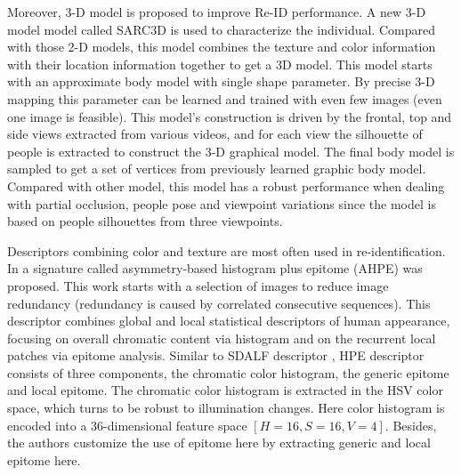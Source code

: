 Moreover, 3-D model is proposed to improve Re-ID performance. A new 3-D model model called SARC3D \cite{SARC3D} is used to characterize the individual. Compared with those 2-D models, this model combines the texture and color information with their location information together to get a 3D model. This model starts with an approximate body model with single shape parameter. By precise 3-D mapping this parameter can be learned and trained with even few images (even one image is feasible). This model's construction is driven by the frontal, top and side views extracted from various videos, and for each view the silhouette of people is extracted to construct the 3-D graphical model. The final body model is sampled to get a set of vertices from previously learned graphic body model. Compared with other model, this model has a robust performance when dealing with partial occlusion, people pose and viewpoint variations since the model is based on people silhouettes from three viewpoints.

Descriptors combining color and texture are most often used in re-identification. In \cite{AppBasedREID} a signature called asymmetry-based histogram plus epitome (AHPE) was proposed. This work starts with a selection of images to reduce image redundancy (redundancy is caused by correlated consecutive sequences). This descriptor combines global and local statistical descriptors of human appearance, focusing on overall chromatic content via histogram and on the recurrent local patches via epitome analysis. Similar to SDALF descriptor \cite{SDALF}, HPE descriptor consists of three components, the chromatic color histogram, the generic epitome and local epitome. The chromatic color histogram is extracted in the HSV color space, which turns to be robust to illumination changes. Here color histogram is encoded into a 36-dimensional feature space $[H=16,  S=16,  V=4]$. Besides, the authors customize the use of epitome here by extracting generic and local epitome here. 

